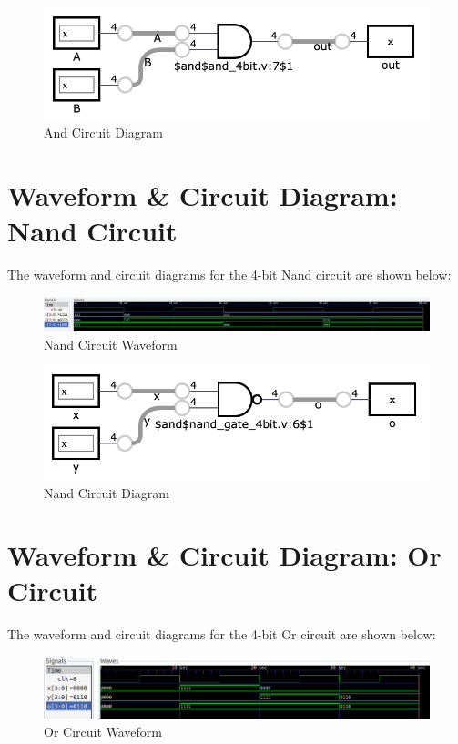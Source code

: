 \documentclass[runningheads, 12pt]{report}
\begin{document}
\begin{figure}[h]
	\centering
	\includegraphics[width=1.0\textwidth]{and_4bit}
	\caption{And Circuit Diagram}
	\label{fig: and_4bit}
\end{figure}
\pagebreak
	\section{Waveform \& Circuit Diagram: Nand Circuit}
	
	The waveform and circuit diagrams for the 4-bit Nand circuit are shown below:

\begin{figure}[h]
	\centering
	\includegraphics[scale=0.625]{gtk_nand_4bit}
	\caption{Nand Circuit Waveform}
	\label{fig: gtk_nand_4bit}
\end{figure}

\begin{figure}[h]
	\centering
	\includegraphics[width=1.0\textwidth]{nand_4bit}
	\caption{Nand Circuit Diagram}
	\label{fig: nand_4bit}
\end{figure}
\pagebreak

	
	\section{Waveform \& Circuit Diagram: Or Circuit}
	
	The waveform and circuit diagrams for the 4-bit Or circuit are shown below:
\begin{figure}[h]
	\centering
	\includegraphics[scale=1.1]{gtk_or_4bit}
	\caption{Or Circuit Waveform}
	\label{fig: gtk_or_4bit}
\end{figure}
\end{document}
